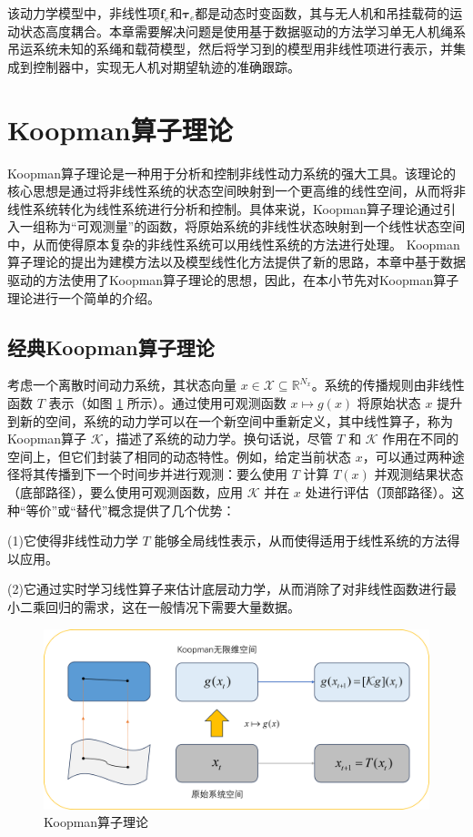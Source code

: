 \documentclass[lang=chs, degree=master, blindreview=false, winfonts=true]{yanputhesis}
\begin{document}
该动力学模型中，非线性项$\bm f_e$和$\bm \tau_e$都是动态时变函数，其与无人机和吊挂载荷的运动状态高度耦合。本章需要解决问题是使用基于数据驱动的方法学习单无人机绳系吊运系统未知的系绳和载荷模型，然后将学习到的模型用非线性项进行表示，并集成到控制器中，实现无人机对期望轨迹的准确跟踪。 




\section{Koopman算子理论}

Koopman算子理论是一种用于分析和控制非线性动力系统的强大工具。该理论的核心思想是通过将非线性系统的状态空间映射到一个更高维的线性空间，从而将非线性系统转化为线性系统进行分析和控制。具体来说，Koopman算子理论通过引入一组称为“可观测量”的函数，将原始系统的非线性状态映射到一个线性状态空间中，从而使得原本复杂的非线性系统可以用线性系统的方法进行处理。
Koopman算子理论的提出为建模方法以及模型线性化方法提供了新的思路，本章中基于数据驱动的方法使用了Koopman算子理论的思想，因此，在本小节先对Koopman算子理论进行一个简单的介绍。

\subsection{经典Koopman算子理论}

考虑一个离散时间动力系统，其状态向量 \( x \in \mathcal{X} \subseteq \mathbb{R}^{N_x} \)。系统的传播规则由非线性函数 \( T \) 表示（如图 \ref{3_1} 所示）。通过使用可观测函数 \( x \mapsto g(x) \) 将原始状态 \( x \) 提升到新的空间，系统的动力学可以在一个新空间中重新定义，其中线性算子，称为Koopman算子 \( \mathcal{K} \)，描述了系统的动力学。换句话说，尽管 \( T \) 和 \( \mathcal{K} \) 作用在不同的空间上，但它们封装了相同的动态特性。例如，给定当前状态 \( x \)，可以通过两种途径将其传播到下一个时间步并进行观测：要么使用 \( T \) 计算 \( T(x) \) 并观测结果状态（底部路径），要么使用可观测函数，应用 \( \mathcal{K} \) 并在 \( x \) 处进行评估（顶部路径）。这种“等价”或“替代”概念提供了几个优势：

(1)它使得非线性动力学 \( T \) 能够全局线性表示，从而使得适用于线性系统的方法得以应用。

(2)它通过实时学习线性算子来估计底层动力学，从而消除了对非线性函数进行最小二乘回归的需求，这在一般情况下需要大量数据。
\begin{figure}[hbt!]
	\centering
	\includegraphics[width=34pc]{picture/3_1.png} 
	\caption{Koopman算子理论} \label{3_1}
\end{figure}
\end{document}
